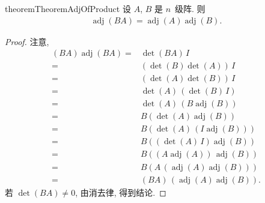 \documentclass[../libro.tex]{subfiles}
\begin{document}
\begin{restatable}{theorem}{TheoremAdjOfProduct}
    设 \(A\), \(B\) 是 \(n\)~级阵.
    则
    \begin{align*}
        \operatorname{adj} {(BA)}
        = \operatorname{adj} {(A)} \operatorname{adj} {(B)}.
    \end{align*}
\end{restatable}

\begin{proof}
    注意,
    \begin{align*}
        (BA) \operatorname{adj} {(BA)}
        = {} &
        \det {(BA)}\, I
        \\
        = {} &
        (\det {(B)} \det {(A)})\, I
        \\
        = {} &
        (\det {(A)} \det {(B)})\, I
        \\
        = {} &
        \det {(A)}\, (\det {(B)}\, I)
        \\
        = {} &
        \det {(A)}\, (B \operatorname{adj} {(B)})
        \\
        = {} &
        B (\det {(A)} \operatorname{adj} {(B)})
        \\
        = {} &
        B (\det {(A)}\, (I \operatorname{adj} {(B)}))
        \\
        = {} &
        B ((\det {(A)}\, I) \operatorname{adj} {(B)})
        \\
        = {} &
        B ((A \operatorname{adj} {(A)})\, \operatorname{adj} {(B)})
        \\
        = {} &
        B (A\, (\operatorname{adj} {(A)} \operatorname{adj} {(B)}))
        \\
        = {} &
        (B A)\, (\operatorname{adj} {(A)} \operatorname{adj} {(B)}).
    \end{align*}
    若 \(\det {(BA)} \neq 0\),
    由消去律, 得到结论.


\end{proof}
\end{document}
